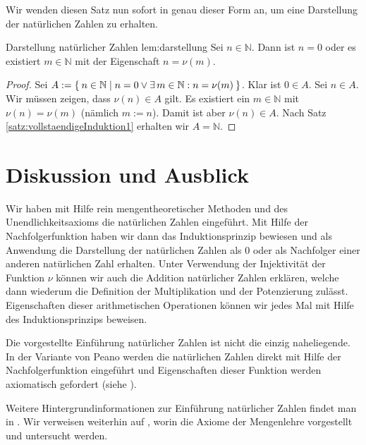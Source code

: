 \documentclass{article}
\begin{document}
Wir wenden diesen Satz nun sofort in genau dieser Form an, um eine Darstellung
der nat\"urlichen Zahlen zu erhalten.

\begin{lemma}{Darstellung nat\"urlicher Zahlen}
             {lem:darstellung}
Sei $n \in \mathbb{N}$. Dann ist $n = 0$ oder es existiert $m \in \mathbb{N}$
mit der Eigenschaft $n = \nu(m)$.
\end{lemma}
\begin{proof}
Sei
$A:=\Set{n \in \mathbb{N} | n = 0 \vee \exists\, m \in \mathbb{N}: n = \nu(m)}$.
Klar ist $0 \in A$. Sei $n \in A$. Wir m\"ussen zeigen, dass $\nu(n) \in A$
gilt. Es existiert ein $m \in \mathbb{N}$ mit $\nu(n) = \nu(m)$ (n\"amlich
$m := n$). Damit ist aber $\nu(n) \in A$. Nach Satz
\ref{satz:vollstaendigeInduktion1} erhalten wir $A = \mathbb{N}$.
\end{proof}

\section{Diskussion und Ausblick}

Wir haben mit Hilfe rein mengentheoretischer Methoden und des
Un\-end\-lich\-keits\-ax\-ioms die nat\"urlichen Zahlen eingef\"uhrt. Mit Hilfe der
Nachfolgerfunktion haben wir dann das Induktionsprinzip bewiesen und als
Anwendung die Darstellung der nat\"urlichen Zahlen als $0$ oder als Nachfolger
einer anderen nat\"urlichen Zahl erhalten. Unter Verwendung der Injektivit\"at
der Funktion $\nu$ k\"onnen wir auch die Addition nat\"urlicher Zahlen
erkl\"aren, welche dann wiederum die Definition der Multiplikation und der
Potenzierung zul\"asst. Eigenschaften dieser arithmetischen Operationen
k\"onnen wir jedes Mal mit Hilfe des Induktionsprinzips beweisen.

Die vorgestellte Einf\"uhrung nat\"urlicher Zahlen ist nicht die einzig
naheliegende. In der Variante von Peano werden die nat\"urlichen Zahlen direkt
mit Hilfe der Nachfolgerfunktion eingef\"uhrt und Eigenschaften dieser Funktion
werden axiomatisch gefordert (siehe \cite{Peano}).

Weitere Hintergrundinformationen zur Einf\"uhrung nat\"urlicher Zahlen findet
man in \cite{Dedekind}. Wir verweisen weiterhin auf \cite{Zermelo}, worin die
Axiome der Mengenlehre vorgestellt und untersucht werden.



\end{document}
